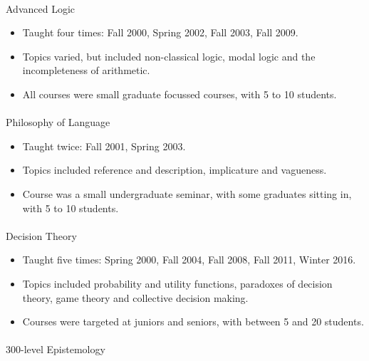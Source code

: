 \documentclass[
  10pt,
  letterpaper,
  DIV=11,
  numbers=noendperiod,
  twoside]{scrartcl}
\makeatletter
\let\oldparagraph\paragraph
\renewcommand{\paragraph}{
    \@ifstar
      \xxxParagraphStar
      \xxxParagraphNoStar
  }
\newcommand{\xxxParagraphStar}[1]{\oldparagraph*{#1}\mbox{}}
\newcommand{\xxxParagraphNoStar}[1]{\oldparagraph{#1}\mbox{}}
\providecommand{\tightlist}{%
  \setlength{\itemsep}{0pt}\setlength{\parskip}{0pt}}\usepackage{longtable,booktabs,array}
\makeatother
\begin{document}
\paragraph{Advanced Logic}\label{advanced-logic}

\begin{itemize}
\tightlist
\item
  Taught four times: Fall 2000, Spring 2002, Fall 2003, Fall 2009.
\item
  Topics varied, but included non-classical logic, modal logic and the
  incompleteness of arithmetic.
\item
  All courses were small graduate focussed courses, with 5 to 10
  students.
\end{itemize}

\paragraph{Philosophy of Language}\label{philosophy-of-language}

\begin{itemize}
\tightlist
\item
  Taught twice: Fall 2001, Spring 2003.
\item
  Topics included reference and description, implicature and vagueness.
\item
  Course was a small undergraduate seminar, with some graduates sitting
  in, with 5 to 10 students.
\end{itemize}

\paragraph{Decision Theory}\label{decision-theory}

\begin{itemize}
\tightlist
\item
  Taught five times: Spring 2000, Fall 2004, Fall 2008, Fall 2011,
  Winter 2016.
\item
  Topics included probability and utility functions, paradoxes of
  decision theory, game theory and collective decision making.
\item
  Courses were targeted at juniors and seniors, with between 5 and 20
  students.
\end{itemize}

\paragraph{300-level Epistemology}\label{level-epistemology}
\end{document}

